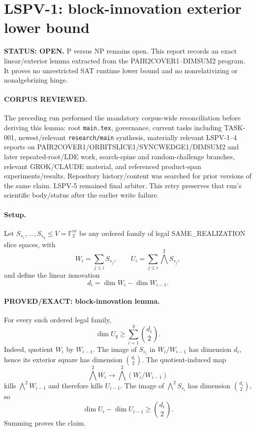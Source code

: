 \documentclass[11pt]{article}
\begin{document}
\section*{LSPV-1: block-innovation exterior lower bound}
\textbf{STATUS: OPEN.} P versus NP remains open. This report records an exact linear/exterior lemma extracted from the PAIR2COVER1--DIMSUM2 program. It proves no unrestricted SAT runtime lower bound and no nonrelativizing or nonalgebrizing hinge.

\paragraph{CORPUS REVIEWED.}
The preceding run performed the mandatory corpus-wide reconciliation before deriving this lemma: root \texttt{main.tex}, governance, current tasks including TASK-001, newest/relevant \texttt{research/main} synthesis, materially relevant LSPV-1--4 reports on PAIR2COVER1/ORBITSLICE1/SYNCWEDGE1/DIMSUM2 and later repeated-root/LDE work, search-spine and random-challenge branches, relevant GROK/CLAUDE material, and referenced product-span experiments/results. Repository history/content was searched for prior versions of the same claim. LSPV-5 remained final arbiter. This retry preserves that run's scientific body/status after the earlier write failure.

\paragraph{Setup.}
Let $S_{s_1},\ldots,S_{s_q}\le V=\mathbb F_2^m$ be any ordered family of legal SAME\_REALIZATION slice spaces, with
\[
W_i=\sum_{j\le i}S_{s_j},\qquad
U_i=\sum_{j\le i}\bigwedge^2S_{s_j},
\]
and define the linear innovation
\[
d_i=\dim W_i-\dim W_{i-1}.
\]

\paragraph{PROVED/EXACT: block-innovation lemma.}
For every such ordered legal family,
\[
\boxed{\dim U_q\ge\sum_{i=1}^q\binom{d_i}{2}.}
\]
Indeed, quotient $W_i$ by $W_{i-1}$. The image of $S_{s_i}$ in $W_i/W_{i-1}$ has dimension $d_i$, hence its exterior square has dimension $\binom{d_i}{2}$. The quotient-induced map
\[
\bigwedge^2 W_i\longrightarrow\bigwedge^2(W_i/W_{i-1})
\]
kills $\bigwedge^2W_{i-1}$ and therefore kills $U_{i-1}$. The image of $\bigwedge^2S_{s_i}$ has dimension $\binom{d_i}{2}$, so
\[
\dim U_i-\dim U_{i-1}\ge\binom{d_i}{2}.
\]
Summing proves the claim.
\end{document}
